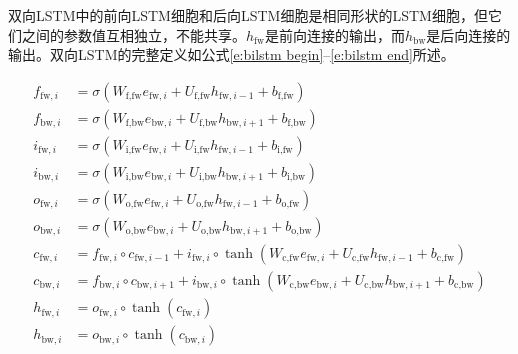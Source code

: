 双向LSTM中的前向LSTM细胞和后向LSTM细胞是相同形状的LSTM细胞，但它们之间的参数值互相独立，不能共享。$h_\text{fw}$是前向连接的输出，而$h_\text{bw}$是后向连接的输出。双向LSTM的完整定义如公式\ref{e:bilstm begin}--\ref{e:bilstm end}所述。

\begin{align}
	f_{\text{fw}, i} &= \sigma(W_{\text{f}, \text{fw}} e_{\text{fw}, i} + U_{\text{f}, \text{fw}} h_{\text{fw}, i - 1} + b_{\text{f}, \text{fw}}) \label{e:bilstm begin} \\
	f_{\text{bw}, i} &= \sigma(W_{\text{f}, \text{bw}} e_{\text{bw}, i} + U_{\text{f}, \text{bw}} h_{\text{bw}, i + 1} + b_{\text{f}, \text{bw}}) \\
	i_{\text{fw}, i} &= \sigma(W_{\text{i}, \text{fw}} e_{\text{fw}, i} + U_{\text{i}, \text{fw}} h_{\text{fw}, i - 1} + b_{\text{i}, \text{fw}}) \\
	i_{\text{bw}, i} &= \sigma(W_{\text{i}, \text{bw}} e_{\text{bw}, i} + U_{\text{i}, \text{bw}} h_{\text{bw}, i + 1} + b_{\text{i}, \text{bw}}) \\
	o_{\text{fw}, i} &= \sigma(W_{\text{o}, \text{fw}} e_{\text{fw}, i} + U_{\text{o}, \text{fw}} h_{\text{fw}, i - 1} + b_{\text{o}, \text{fw}}) \\
	o_{\text{bw}, i} &= \sigma(W_{\text{o}, \text{bw}} e_{\text{bw}, i} + U_{\text{o}, \text{bw}} h_{\text{bw}, i + 1} + b_{\text{o}, \text{bw}}) \\
	c_{\text{fw}, i} &= f_{\text{fw}, i} \circ c_{\text{fw}, i - 1} + i_{\text{fw}, i} \circ \tanh(W_{\text{c}, \text{fw}} e_{\text{fw}, i} + U_{\text{c}, \text{fw}} h_{\text{fw}, i - 1} + b_{\text{c}, \text{fw}}) \\
	c_{\text{bw}, i} &= f_{\text{bw}, i} \circ c_{\text{bw}, i + 1} + i_{\text{bw}, i} \circ \tanh(W_{\text{c}, \text{bw}} e_{\text{bw}, i} + U_{\text{c}, \text{bw}} h_{\text{bw}, i + 1} + b_{\text{c}, \text{bw}}) \\
	h_{\text{fw}, i} &= o_{\text{fw}, i} \circ \tanh(c_{\text{fw}, i}) \\
	h_{\text{bw}, i} &= o_{\text{bw}, i} \circ \tanh(c_{\text{bw}, i}) \label{e:bilstm end}
\end{align}

\begin{comment}
与上文所述的各种方法类似，词嵌入模型中包含两个词嵌入矩阵$E$与$E'$，分别用于目标词与上下文的嵌入。这样，可以得到目标词向量$e_i = E_v$与上下文词向量$e'_j = E'_{s_j}, j \neq i$。

对于一个好的词嵌入，我们希望一个词语能够更容易被它的上下文所预测出来。即存在：
\begin{equation}
M_{E, E'}\bigl((s_1, \dots, s_{i - 1}, s_{i + 1}, \dots, s_{|s|})\bigr) = v
\end{equation}
$M_{E, E'}$是一个预测模型，而$E$与$E'$是它的参数。
\end{comment}
